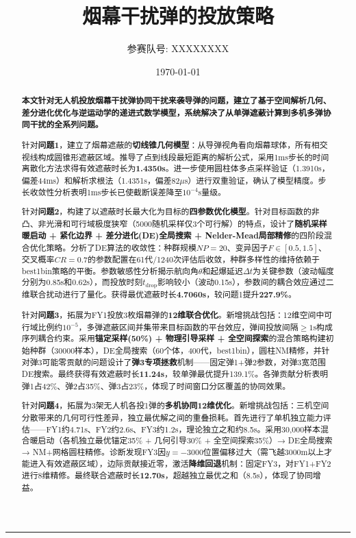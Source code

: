 \documentclass[12pt,a4paper]{ctexart}
\title{\textbf{\Huge 烟幕干扰弹的投放策略}}
\author{\large 参赛队号: XXXXXXXX}
\date{\today}
\begin{document}
\maketitle
\begin{center}\rule{0.95\textwidth}{0.6pt}\end{center}

\begin{abstract}
\noindent
\textbf{本文针对无人机投放烟幕干扰弹协同干扰来袭导弹的问题，建立了基于空间解析几何、差分进化优化与逆运动学的递进式数学模型，系统解决了从单弹遮蔽计算到多机多弹协同干扰的全系列问题。}

针对\textbf{问题1}，建立了烟幕遮蔽的\textbf{切线锥几何模型}：从导弹视角看向烟幕球体，所有相交视线构成圆锥形遮蔽区域。推导了点到线段最短距离的解析公式，采用1ms步长的时间离散化方法求得有效遮蔽时长为\textbf{1.4350s}。进一步使用圆柱体多点采样验证（1.3910s，偏差44ms）和解析求根法（1.4351s，偏差82$\mu$s）进行双重验证，确认了模型精度。步长收敛性分析表明1ms步长已使截断误差降至$10^{-4}$s量级。

针对\textbf{问题2}，构建了以遮蔽时长最大化为目标的\textbf{四参数优化模型}。针对目标函数的非凸、非光滑和可行域极度狭窄（5000随机采样仅3个可行解）的特点，设计了\textbf{随机采样暖启动 + 紧化边界 + 差分进化(DE)全局搜索 + Nelder-Mead局部精修}的四阶段混合优化策略。分析了DE算法的收敛性：种群规模$NP=20$、变异因子$F\in[0.5,1.5]$、交叉概率$CR=0.7$的参数配置在61代/1240次评估后收敛，种群多样性的维持依赖于best1bin策略的平衡。参数敏感性分析揭示航向角$\theta$和起爆延迟$\Delta t$为关键参数（波动幅度分别为0.85s和0.62s），而投放时刻$t_{\text{drop}}$影响较小（波动0.15s），参数间的耦合效应通过二维联合扰动进行了量化。获得最优遮蔽时长\textbf{4.7060s}，较问题1提升\textbf{227.9\%}。

针对\textbf{问题3}，拓展为FY1投放3枚烟幕弹的\textbf{12维联合优化}。新增挑战包括：12维空间中可行域比例约$10^{-5}$，多弹遮蔽区间并集带来目标函数的平台效应，弹间投放间隔$\geq 1$s构成序列耦合约束。采用\textbf{锚定采样(50\%) + 物理引导采样 + 全空间探索}的混合策略构建初始种群（30000样本），DE全局搜索（60个体，400代，best1bin），圆柱NM精修，并针对弹3可能零贡献的问题设计了\textbf{弹3专项拯救}机制——固定弹1+弹2参数，对弹3宽范围DE搜索。最终获得有效遮蔽时长\textbf{11.24s}，较单弹最优提升139.1\%。各弹贡献分析表明弹1占42\%、弹2占35\%、弹3占23\%，体现了时间窗口分区覆盖的协同效果。

针对\textbf{问题4}，拓展为3架无人机各投1弹的\textbf{多机协同12维优化}。新增挑战包括：三机空间分散带来的几何可行性差异，独立最优解之间的重叠损耗。首先进行了单机独立能力评估——FY1约4.71s、FY2约2.6s、FY3约1.2s，理论独立之和约8.5s。采用30,000样本混合暖启动（各机独立最优锚定35\% + 几何引导30\% + 全空间探索35\%）→ DE全局搜索 → NM+网格圆柱精修。诊断发现FY3因$y=-3000$位置偏移过大（需飞越3000m以上才能进入有效遮蔽区域），边际贡献接近零，激活\textbf{降维回退}机制：固定FY3，对FY1+FY2进行8维精修。最终联合遮蔽时长\textbf{12.70s}，超越独立最优之和（8.5s），体现了协同增益。


\end{abstract}
\end{document}
